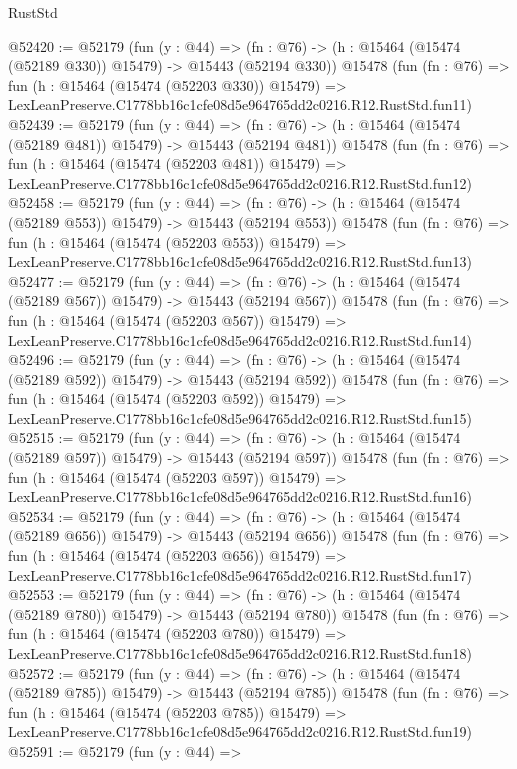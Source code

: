 \begin{lexlean}{RustStd}
\begin{coremodule}
@52420 := @52179
    (fun (y : @44) =>
    (fn : @76) -> (h : @15464 (@15474 (@52189 @330)) @15479) -> @15443 (@52194 @330))
    @15478
    (fun (fn : @76) =>
    fun (h : @15464 (@15474 (@52203 @330)) @15479) =>
    LexLeanPreserve.C1778bb16c1cfe08d5e964765dd2c0216.R12.RustStd.fun11)
@52439 := @52179
    (fun (y : @44) =>
    (fn : @76) -> (h : @15464 (@15474 (@52189 @481)) @15479) -> @15443 (@52194 @481))
    @15478
    (fun (fn : @76) =>
    fun (h : @15464 (@15474 (@52203 @481)) @15479) =>
    LexLeanPreserve.C1778bb16c1cfe08d5e964765dd2c0216.R12.RustStd.fun12)
@52458 := @52179
    (fun (y : @44) =>
    (fn : @76) -> (h : @15464 (@15474 (@52189 @553)) @15479) -> @15443 (@52194 @553))
    @15478
    (fun (fn : @76) =>
    fun (h : @15464 (@15474 (@52203 @553)) @15479) =>
    LexLeanPreserve.C1778bb16c1cfe08d5e964765dd2c0216.R12.RustStd.fun13)
@52477 := @52179
    (fun (y : @44) =>
    (fn : @76) -> (h : @15464 (@15474 (@52189 @567)) @15479) -> @15443 (@52194 @567))
    @15478
    (fun (fn : @76) =>
    fun (h : @15464 (@15474 (@52203 @567)) @15479) =>
    LexLeanPreserve.C1778bb16c1cfe08d5e964765dd2c0216.R12.RustStd.fun14)
@52496 := @52179
    (fun (y : @44) =>
    (fn : @76) -> (h : @15464 (@15474 (@52189 @592)) @15479) -> @15443 (@52194 @592))
    @15478
    (fun (fn : @76) =>
    fun (h : @15464 (@15474 (@52203 @592)) @15479) =>
    LexLeanPreserve.C1778bb16c1cfe08d5e964765dd2c0216.R12.RustStd.fun15)
@52515 := @52179
    (fun (y : @44) =>
    (fn : @76) -> (h : @15464 (@15474 (@52189 @597)) @15479) -> @15443 (@52194 @597))
    @15478
    (fun (fn : @76) =>
    fun (h : @15464 (@15474 (@52203 @597)) @15479) =>
    LexLeanPreserve.C1778bb16c1cfe08d5e964765dd2c0216.R12.RustStd.fun16)
@52534 := @52179
    (fun (y : @44) =>
    (fn : @76) -> (h : @15464 (@15474 (@52189 @656)) @15479) -> @15443 (@52194 @656))
    @15478
    (fun (fn : @76) =>
    fun (h : @15464 (@15474 (@52203 @656)) @15479) =>
    LexLeanPreserve.C1778bb16c1cfe08d5e964765dd2c0216.R12.RustStd.fun17)
@52553 := @52179
    (fun (y : @44) =>
    (fn : @76) -> (h : @15464 (@15474 (@52189 @780)) @15479) -> @15443 (@52194 @780))
    @15478
    (fun (fn : @76) =>
    fun (h : @15464 (@15474 (@52203 @780)) @15479) =>
    LexLeanPreserve.C1778bb16c1cfe08d5e964765dd2c0216.R12.RustStd.fun18)
@52572 := @52179
    (fun (y : @44) =>
    (fn : @76) -> (h : @15464 (@15474 (@52189 @785)) @15479) -> @15443 (@52194 @785))
    @15478
    (fun (fn : @76) =>
    fun (h : @15464 (@15474 (@52203 @785)) @15479) =>
    LexLeanPreserve.C1778bb16c1cfe08d5e964765dd2c0216.R12.RustStd.fun19)
@52591 := @52179
    (fun (y : @44) =>

\end{coremodule}
\end{lexlean}
